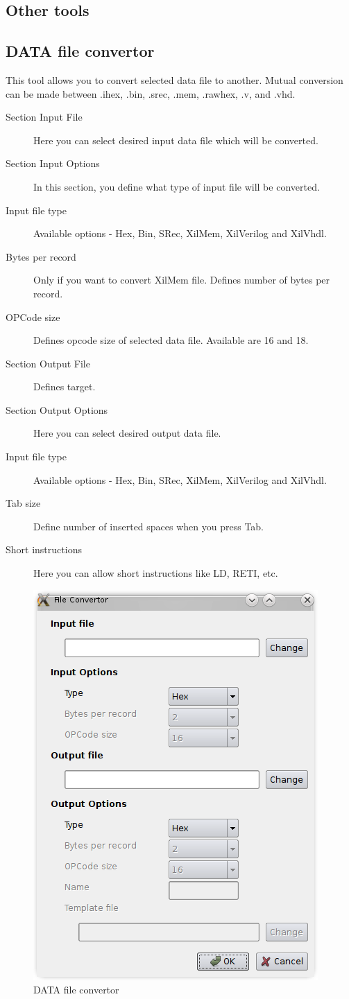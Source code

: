 \subsection{Other tools}

\subsection{DATA file convertor}
    This tool allows you to convert selected data file to another. Mutual conversion can be made between .ihex, .bin,
    .srec, .mem, .rawhex, .v, and .vhd.
    \begin{description}
        \item[Section Input File] Here you can select desired input data file which will be converted.
        \item[Section Input Options] In this section, you define what type of input file will be converted.
        \item[Input file type] Available options - Hex, Bin, SRec, XilMem, XilVerilog and XilVhdl.
        \item[Bytes per record] Only if you want to convert XilMem file. Defines number of bytes per record.
        \item[OPCode size] Defines opcode size of selected data file. Available are 16 and 18.
        \item[Section Output File] Defines target.
        \item[Section Output Options] Here you can select desired output data file.
        \item[Input file type] Available options - Hex, Bin, SRec, XilMem, XilVerilog and XilVhdl.
        \item[Tab size]  Define number of inserted spaces when you press Tab.
        \item[Short instructions] Here you can allow short instructions like LD, RETI, etc.
    \end{description}

    \begin{figure}[h]
        \centering{}
        \includegraphics[width=.5\textwidth]{img/DATA_convertor.png}
        \caption{DATA file convertor}
    \end{figure}

